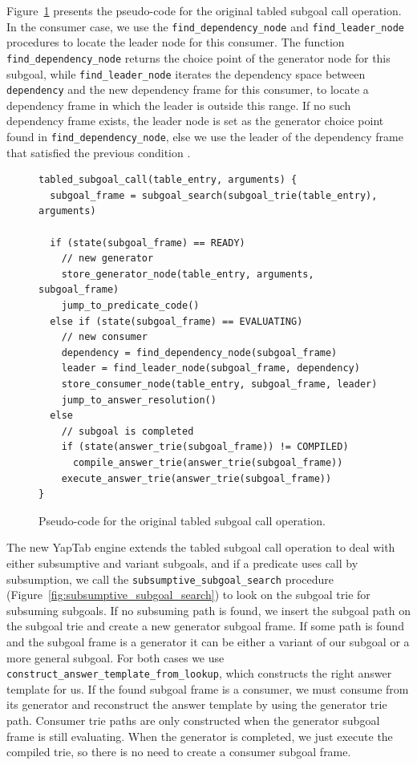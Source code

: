 Figure~\ref{fig:tabled_subgoal_call} presents the pseudo-code for the original tabled subgoal call operation.
In the consumer case, we use the \texttt{find\_dependency\_node} and \texttt{find\_leader\_node} procedures
to locate the leader node for this consumer. The function \texttt{find\_dependency\_node}
returns the choice point of the generator node for this subgoal, while \texttt{find\_leader\_node}
iterates the dependency space between \texttt{dependency} and the new dependency frame for this consumer,
to locate a dependency frame in which the leader is outside this range. If no such dependency frame
exists, the leader node is set as the generator choice point found in \texttt{find\_dependency\_node},
else we use the leader of the dependency frame that satisfied the previous condition \cite{Rocha-PhD}.

\begin{figure}[ht]
\begin{Verbatim}
tabled_subgoal_call(table_entry, arguments) {
  subgoal_frame = subgoal_search(subgoal_trie(table_entry), arguments)
  
  if (state(subgoal_frame) == READY)
    // new generator
    store_generator_node(table_entry, arguments, subgoal_frame)
    jump_to_predicate_code()
  else if (state(subgoal_frame) == EVALUATING)
    // new consumer
    dependency = find_dependency_node(subgoal_frame)
    leader = find_leader_node(subgoal_frame, dependency)
    store_consumer_node(table_entry, subgoal_frame, leader)
    jump_to_answer_resolution()
  else
    // subgoal is completed
    if (state(answer_trie(subgoal_frame)) != COMPILED)
      compile_answer_trie(answer_trie(subgoal_frame))
    execute_answer_trie(answer_trie(subgoal_frame))
}
\end{Verbatim}
\caption{Pseudo-code for the original tabled subgoal call operation.}
\label{fig:tabled_subgoal_call}
\end{figure}

The new YapTab engine extends the tabled subgoal call operation to deal with either subsumptive and variant subgoals,
and if a predicate uses call by subsumption, we call the \texttt{subsumptive\_subgoal\_search} procedure
(Figure~\ref{fig:subsumptive_subgoal_search}) to look on the subgoal trie for subsuming subgoals.
If no subsuming path is found, we insert the subgoal path on the subgoal trie and create a new generator
subgoal frame. If some path is found and the subgoal frame is a generator it can be either
a variant of our subgoal or a more general subgoal. For both cases
we use \texttt{construct\_answer\_template\_from\_lookup}, which constructs the right answer template for us.
If the found subgoal frame is a consumer, we must consume from its generator and reconstruct the answer
template by using the generator trie path.
Consumer trie paths are only constructed when the generator subgoal frame is still evaluating.
When the generator is completed, we just execute the compiled trie, so there is no need
to create a consumer subgoal frame.

